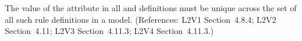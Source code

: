 The value of the  attribute in all \AssignmentRule and
\RateRule definitions must be unique across the set of all such rule
definitions in a model.  (References: L2V1 Section~4.8.4; 
L2V2 Section~4.11; L2V3 Section~4.11.3; L2V4 Section~4.11.3.)
